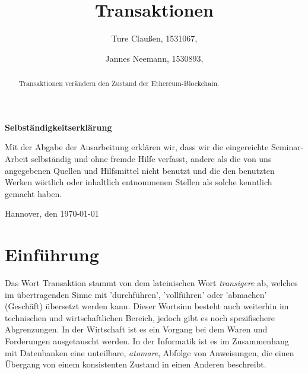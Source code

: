 \documentclass[runningheads]{llncs}
\begin{document}
\title{Transaktionen}
\author{Ture Claußen, 1531067,  \and Jannes Neemann, 1530893, }

{\def\addcontentsline#1#2#3{}\maketitle} %

\begin{center} \sffamily\bfseries Selbständigkeitserklärung \end{center}

Mit der Abgabe der Ausarbeitung erklären wir, dass wir die eingereichte Seminar-Arbeit
selbständig und ohne fremde Hilfe verfasst, andere als die von uns angegebenen Quellen
und Hilfsmittel nicht benutzt und die den benutzten Werken wörtlich oder
inhaltlich entnommenen Stellen als solche kenntlich gemacht haben.
\vspace*{7ex}

Hannover, den \today \hfill



\begin{abstract}
  Transaktionen verändern den Zustand der Ethereum-Blockchain.  
\end{abstract}

\tableofcontents  %
%
%
%
\section{Einführung}
Das Wort Transaktion stammt von dem lateinischen Wort \textit{transigere} ab, welches im übertragenden Sinne mit 'durchführen', 'vollführen' oder 'abmachen' (Geschäft) übersetzt werden kann. \cite{noauthor_transigere_nodate} Dieser Wortsinn besteht auch weiterhin im technischen und wirtschaftlichen Bereich, jedoch gibt es noch spezifischere Abgrenzungen. In der Wirtschaft ist es ein Vorgang bei dem Waren und Forderungen ausgetauscht werden. \cite[S. 18 f.]{ehrlicher_kompendium_1975} In der Informatik ist es im Zusammenhang mit Datenbanken eine unteilbare, \textit{atomare}, Abfolge von Anweisungen, die einen Übergang von einem konsistenten Zustand in einen Anderen beschreibt. \cite[S.520]{herold_grundlagen_2017}
\end{document}

